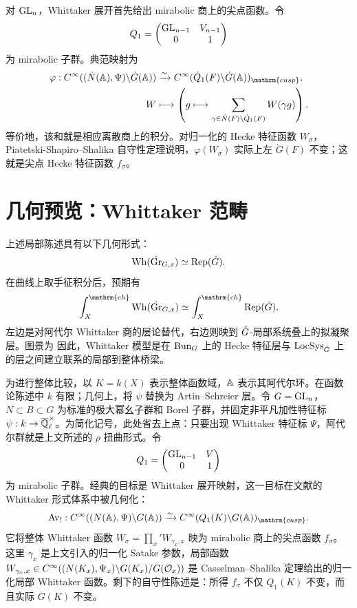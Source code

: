 对 $\operatorname{GL}_n$，Whittaker 展开首先给出 mirabolic 商上的尖点函数。令
\[Q_1=\begin{pmatrix}\operatorname{GL}_{n-1}&V_{n-1}\\0&1\end{pmatrix}\]
为 mirabolic 子群。典范映射为
\[
\begin{aligned}
\varphi:C^\infty((\dot N(\A),\Psi)\backslash\dot G(\A))&\xrightarrow{\sim}C^\infty(\dot Q_1(F)\backslash\dot G(\A))_{\mathrm{cusp}},\\
W&\longmapsto\left(g\longmapsto\sum_{\gamma\in\dot N(F)\backslash\dot Q_1(F)}W(\gamma g)\right).
\end{aligned}
\]
等价地，该和就是相应离散商上的积分。对归一化的 Hecke 特征函数 $W_\sigma$，Piatetski-Shapiro–Shalika 自守性定理说明，$\varphi(W_\sigma)$ 实际上左 $\dot G(F)$ 不变；这就是尖点 Hecke 特征函数 $f_\sigma$。
\section{几何预览：Whittaker 范畴}\label{sec:3.6}
上述局部陈述具有以下几何形式\cite{Gai18}：
\[\operatorname{Wh}(\dot{\operatorname{Gr}}_{G,x})\simeq\operatorname{Rep}(\check{G}).\]
在曲线上取手征积分后，预期有
\[\int_X^{\mathrm{ch}}\operatorname{Wh}(\dot{\Gr}_{G,x})\simeq\int_X^{\mathrm{ch}}\Rep(\checkG).\]
左边是对阿代尔 Whittaker 商的层论替代，右边则映到 $\check{G}$-局部系统叠上的拟凝聚层。图景为
因此，Whittaker 模型是在 $\operatorname{Bun}_G$ 上的 Hecke 特征层与 $\operatorname{LocSys}_{\check{G}}$ 上的层之间建立联系的局部到整体桥梁。

为进行整体比较，以 $K=k(X)$ 表示整体函数域，$\mathbb{A}$ 表示其阿代尔环。在函数论陈述中 $k$ 有限；几何上，将 $\psi$ 替换为 Artin–Schreier 层。令 $G=\operatorname{GL}_n$，$N\subset B\subset G$ 为标准的极大幂幺子群和 Borel 子群，并固定非平凡加性特征标 $\psi:k\to\overline{\mathbb{Q}}_{\ell}^\times$。为简化记号，此处省去上点：只要出现 Whittaker 特征标 $\Psi$，阿代尔群就是上文所述的 $\rho$ 扭曲形式。令
\[Q_1=\begin{pmatrix}\operatorname{GL}_{n-1}&V\\0&1\end{pmatrix}\]
为 mirabolic 子群。经典的目标是 Whittaker 展开映射，这一目标在文献\cite{FGKV98,Gai18}的 Whittaker 形式体系中被几何化：
\[\Av_!:C^\infty((N(\A),\Psi)\backslash G(\A))\xrightarrow{\sim}C^\infty(Q_1(K)\backslash G(\A))_{\mathrm{cusp}}.\]
它将整体 Whittaker 函数 $W_\sigma=\prod_x'W_{\gamma_x,x}$ 映为 mirabolic 商上的尖点函数 $f_\sigma$。这里 $\gamma_x$ 是上文引入的归一化 Satake 参数，局部函数 $W_{\gamma_x,x}\in C^\infty((N(K_x),\Psi_x)\backslash G(K_x)/G(\mathcal{O}_x))$ 是
Casselman–Shalika 定理给出的归一化局部 Whittaker 函数。剩下的自守性陈述是：所得 $f_\sigma$ 不仅 $Q_1(K)$ 不变，而且实际 $G(K)$ 不变。

